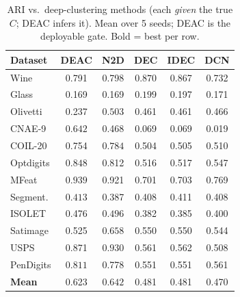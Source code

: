 \begin{table}[!t]
\centering
\caption{ARI vs.\ deep-clustering methods (each \emph{given} the true $C$; DEAC infers it). Mean over 5 seeds; DEAC is the deployable gate. Bold = best per row.}
\label{tab:deep}
\footnotesize
\setlength{\tabcolsep}{3pt}
\begin{tabular}{lccccc}
\toprule
Dataset & \textbf{DEAC} & N2D & DEC & IDEC & DCN \\
\midrule
Wine & 0.791 & 0.798 & $\mathbf{0.870}$ & 0.867 & 0.732 \\
Glass & 0.169 & 0.169 & $\mathbf{0.199}$ & 0.197 & 0.171 \\
Olivetti & 0.237 & $\mathbf{0.503}$ & 0.461 & 0.461 & 0.466 \\
CNAE-9 & $\mathbf{0.642}$ & 0.468 & 0.069 & 0.069 & 0.019 \\
COIL-20 & 0.754 & $\mathbf{0.784}$ & 0.504 & 0.505 & 0.510 \\
Optdigits & $\mathbf{0.848}$ & 0.812 & 0.516 & 0.517 & 0.547 \\
MFeat & $\mathbf{0.939}$ & 0.921 & 0.701 & 0.703 & 0.769 \\
Segment. & $\mathbf{0.413}$ & 0.387 & 0.408 & 0.411 & 0.408 \\
ISOLET & 0.476 & $\mathbf{0.496}$ & 0.382 & 0.385 & 0.400 \\
Satimage & 0.525 & $\mathbf{0.658}$ & 0.550 & 0.550 & 0.544 \\
USPS & 0.871 & $\mathbf{0.930}$ & 0.561 & 0.562 & 0.508 \\
PenDigits & $\mathbf{0.811}$ & 0.778 & 0.551 & 0.551 & 0.561 \\
\midrule
\textbf{Mean} & 0.623 & $\mathbf{0.642}$ & 0.481 & 0.481 & 0.470 \\
\bottomrule
\end{tabular}
\end{table}
